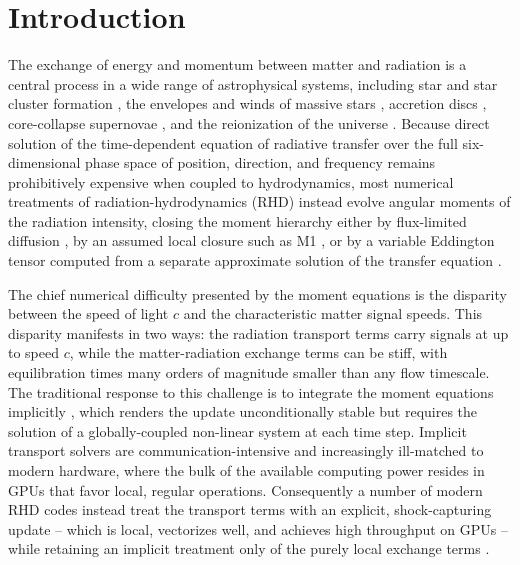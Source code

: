 \documentclass[preprint,12pt,authoryear]{elsarticle}
\begin{document}
\section{Introduction}
\label{sec:intro}

The exchange of energy and momentum between matter and radiation is a central process in a wide range of astrophysical systems, including star and star cluster formation \citep[e.g.,][]{Krumholz12b, Skinner15a, Rosen16a, Menon22b}, the envelopes and winds of massive stars \citep[e.g.,][]{Jiang15a, Jiang17a}, accretion discs \citep[e.g.,][]{Jiang13a}, core-collapse supernovae \citep[e.g.,][]{Skinner19a}, and the reionization of the universe \citep[e.g.,][]{Gnedin01a, Rosdahl13a, Kimm14a}. Because direct solution of the time-dependent equation of radiative transfer over the full six-dimensional phase space of position, direction, and frequency remains prohibitively expensive when coupled to hydrodynamics, most numerical treatments of radiation-hydrodynamics (RHD) instead evolve angular moments of the radiation intensity, closing the moment hierarchy either by flux-limited diffusion \citep[FLD; e.g.,][]{Turner01a, Howell03a, Krumholz07b, Kuiper10a}, by an assumed local closure such as M1 \citep[e.g.,][]{Gonzalez07a, Rosdahl13a, Skinner13a, Kannan18a}, or by a variable Eddington tensor computed from a separate approximate solution of the transfer equation \citep[e.g.,][]{Gnedin01a, Jiang12a, Davis12a, Menon22a}.

The chief numerical difficulty presented by the moment equations is the disparity between the speed of light $c$ and the characteristic matter signal speeds. This disparity manifests in two ways: the radiation transport terms carry signals at up to speed $c$, while the matter-radiation exchange terms can be stiff, with equilibration times many orders of magnitude smaller than any flow timescale. The traditional response to this challenge is to integrate the moment equations implicitly \citep[e.g.,][]{Turner01a, Howell03a, Krumholz07b, Jiang21a}, which renders the update unconditionally stable but requires the solution of a globally-coupled non-linear system at each time step. Implicit transport solvers are communication-intensive and increasingly ill-matched to modern hardware, where the bulk of the available computing power resides in GPUs that favor local, regular operations. Consequently a number of modern RHD codes instead treat the transport terms with an explicit, shock-capturing update -- which is local, vectorizes well, and achieves high throughput on GPUs -- while retaining an implicit treatment only of the purely local exchange terms \citep[e.g.,][]{Skinner13a, Rosdahl13a, Kimm14a, Kannan18a, Skinner19a, Wibking22a, He24b, He24a}.
\end{document}
